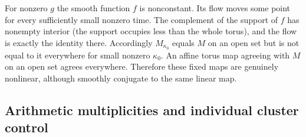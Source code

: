 For nonzero \(g\) the smooth function \(f\) is nonconstant. Its flow moves some point for every sufficiently small nonzero time. The complement of the support of \(f\) has nonempty interior (the support occupies less than the whole torus), and the flow is exactly the identity there. Accordingly \(M_{\kappa_0}\) equals \(M\) on an open set but is not equal to it everywhere for small nonzero \({\kappa_0}\). An affine torus map agreeing with \(M\) on an open set agrees everywhere. Therefore these fixed maps are genuinely nonlinear, although smoothly conjugate to the same linear map.

\subsection{Arithmetic multiplicities and individual cluster control}\label{locality:arithmetic-multiplicities-and-individual-cluster-control}

